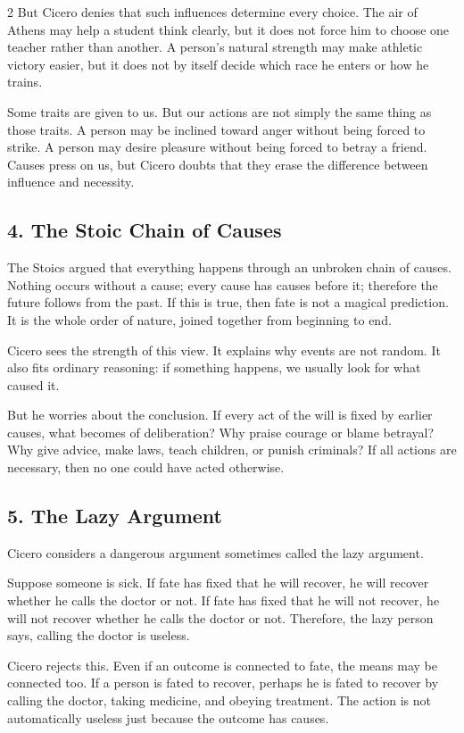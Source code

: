 \documentclass[12pt]{article}
\begin{document}
\begin{multicols}{2}
But Cicero denies that such influences determine every choice. The air of Athens may help a student think clearly, but it does not force him to choose one teacher rather than another. A person's natural strength may make athletic victory easier, but it does not by itself decide which race he enters or how he trains.

Some traits are given to us. But our actions are not simply the same thing as those traits. A person may be inclined toward anger without being forced to strike. A person may desire pleasure without being forced to betray a friend. Causes press on us, but Cicero doubts that they erase the difference between influence and necessity.

\subsection*{4. The Stoic Chain of Causes}
The Stoics argued that everything happens through an unbroken chain of causes. Nothing occurs without a cause; every cause has causes before it; therefore the future follows from the past. If this is true, then fate is not a magical prediction. It is the whole order of nature, joined together from beginning to end.

Cicero sees the strength of this view. It explains why events are not random. It also fits ordinary reasoning: if something happens, we usually look for what caused it.

But he worries about the conclusion. If every act of the will is fixed by earlier causes, what becomes of deliberation? Why praise courage or blame betrayal? Why give advice, make laws, teach children, or punish criminals? If all actions are necessary, then no one could have acted otherwise.

\subsection*{5. The Lazy Argument}
Cicero considers a dangerous argument sometimes called the lazy argument.

Suppose someone is sick. If fate has fixed that he will recover, he will recover whether he calls the doctor or not. If fate has fixed that he will not recover, he will not recover whether he calls the doctor or not. Therefore, the lazy person says, calling the doctor is useless.

Cicero rejects this. Even if an outcome is connected to fate, the means may be connected too. If a person is fated to recover, perhaps he is fated to recover by calling the doctor, taking medicine, and obeying treatment. The action is not automatically useless just because the outcome has causes.


\end{multicols}
\end{document}
